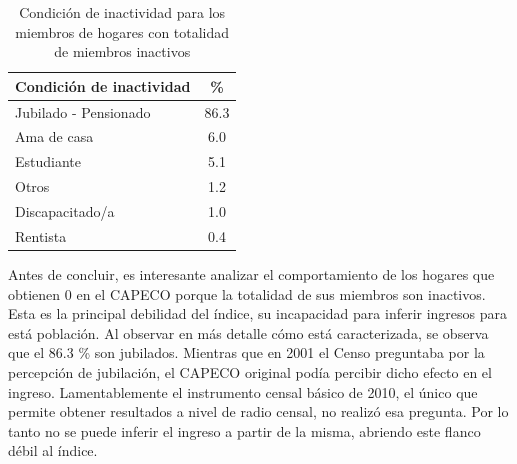      \begin{table}[h!]
     	\centering
     	\caption{Condición de inactividad para los miembros de hogares con totalidad de miembros inactivos}
     	\label{tab:tableInactivos}
     	\begin{tabular}{l|c}
     		Condición de inactividad & \% \\
     		\hline
     		\hline
     		Jubilado - Pensionado &  86.3 \\
     		Ama de casa & 6.0\\
     		Estudiante &  5.1\\
     		Otros &   1.2\\
     		Discapacitado/a & 1.0 \\
     		Rentista &  0.4\\	
     	\end{tabular}
     \end{table}
          
     
Antes de concluir, es interesante analizar el comportamiento de los hogares que obtienen 0 en el CAPECO porque la totalidad de sus miembros son inactivos. Esta es la principal debilidad del índice, su incapacidad para inferir ingresos para está población. Al observar en más detalle cómo está caracterizada, se observa que el 86.3 \% son jubilados. Mientras que en 2001 el Censo preguntaba por la percepción de jubilación, el CAPECO original podía percibir dicho efecto en el ingreso. Lamentablemente el instrumento censal básico de 2010, el único que permite obtener resultados a nivel de radio censal, no realizó esa pregunta. Por lo tanto no se puede inferir el ingreso a partir de la misma, abriendo este flanco débil al índice.   